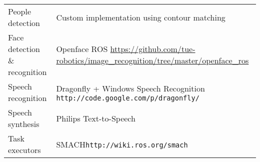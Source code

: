 \begin{table}[H]
\begin{center}
\begin{tabular}{p{} p{}}
            People detection & Custom implementation using contour matching \\
            Face detection \& recognition & Openface ROS \newline \url{https://github.com/tue-robotics/image_recognition/tree/master/openface_ros} \\
            Speech recognition & Dragonfly + Windows Speech Recognition \newline \texttt{http://code.google.com/p/dragonfly/}\\
            Speech synthesis & Philips Text-to-Speech\\
            Task executors & SMACH\newline\texttt{http://wiki.ros.org/smach}\\
            \bottomrule
        \end{tabular}
    \end{center}
\end{table}

